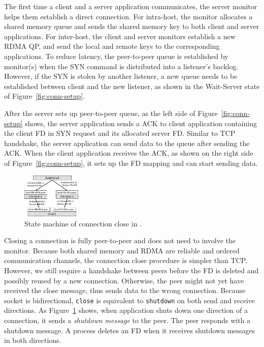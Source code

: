 The first time a client and a server application communicates, the server monitor helps them establish a direct connection.
For intra-host, the monitor allocates a shared memory queue and sends the shared memory key to both client and server applications.
For inter-host, the client and server monitors establish a new RDMA QP, and send the local and remote keys to the corresponding applications.
To reduce latency, the peer-to-peer queue is established by monitor(s) when the SYN command is distributed into a listener's backlog.
However, if the SYN is stolen by another listener, a new queue needs to be established between client and the new listener, as shown in the Wait-Server state of Figure~\ref{fig:conn-setup}.

After the server sets up peer-to-peer queue, as the left side of Figure~\ref{fig:conn-setup} shows, the server application sends a ACK to client application containing the client FD in SYN request and its allocated server FD.
Similar to TCP handshake, the server application can send data to the queue after sending the ACK.
When the client application receives the ACK, as shown on the right side of Figure~\ref{fig:conn-setup}, it sets up the FD mapping and can start sending data.


\begin{figure}[t!]
	\centering
	\includegraphics[width=0.25\textwidth]{images/conn-close-new}
	\vspace{-5pt}
	\caption{State machine of connection close in \libipc{}.}
	\label{fig:conn-close}
\end{figure}


Closing a connection is fully peer-to-peer and does not need to involve the monitor.
Because both shared memory and RDMA are reliable and ordered communication channels, the connection close procedure is simpler than TCP.
However, we still require a handshake between peers before the FD is deleted and possibly reused by a new connection.
Otherwise, the peer might not yet have received the close message, thus sends data to the wrong connection.
Because socket is bidirectional, \texttt{close} is equivalent to \texttt{shutdown} on both send and receive directions.
As Figure~\ref{fig:conn-close} shows, when application shuts down one direction of a connection, it sends a \emph{shutdown message} to the peer.
The peer responds with a shutdown message.
A process deletes an FD when it receives shutdown messages in both directions.



